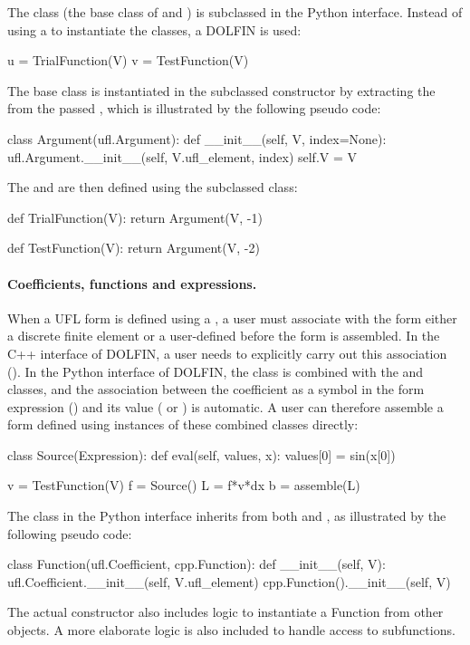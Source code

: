 The  class (the base class of 
and ) is subclassed in the Python interface. Instead
of using a  to instantiate the classes, a DOLFIN
 is used:
\begin{python}
u = TrialFunction(V)
v = TestFunction(V)
\end{python}
The  base class is instantiated in the subclassed
constructor by extracting the  from the passed
, which is illustrated by the following pseudo
code:
\begin{python}
class Argument(ufl.Argument):
    def __init__(self, V, index=None):
        ufl.Argument.__init__(self, V.ufl_element, index)
        self.V = V
\end{python}
The  and  are then defined using the
subclassed  class:
\begin{python}
def TrialFunction(V):
    return Argument(V, -1)

def TestFunction(V):
    return Argument(V, -2)
\end{python}

\paragraph{Coefficients, functions and expressions.}

When a UFL form is defined using a , a user must
associate with the form either a discrete finite element
 or a user-defined  before the form is
assembled. In the C++ interface of DOLFIN, a user needs to explicitly
carry out this association (). In the Python interface of
DOLFIN, the  class is combined with the \dolfin
{} and  classes, and the association
between the coefficient as a symbol in the form expression
() and its value ( or )
is automatic. A user can therefore assemble a form defined using
instances of these combined classes directly:
\begin{python}
class Source(Expression):
    def eval(self, values, x):
        values[0] = sin(x[0])

v = TestFunction(V)
f = Source()
L = f*v*dx
b = assemble(L)
\end{python}
The  class in the Python interface inherits from both
 and , as illustrated by the
following pseudo code:
\begin{python}
class Function(ufl.Coefficient, cpp.Function):
    def __init__(self, V):
        ufl.Coefficient.__init__(self, V.ufl_element)
        cpp.Function().__init__(self, V)
\end{python}
The actual constructor also includes logic to instantiate a Function
from other objects. A more elaborate logic is also included to handle
access to subfunctions.

